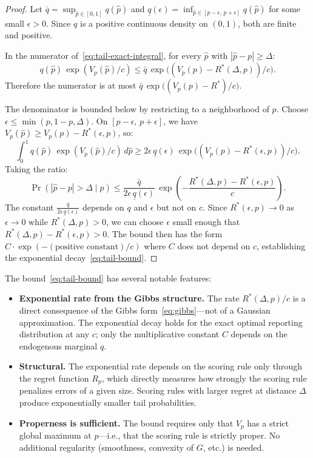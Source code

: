 \documentclass[11pt]{article}
\begin{document}
\begin{proof}
Let $\bar{q} = \sup_{\hat{p} \in [0,1]} q(\hat{p})$ and $\underline{q}(\epsilon) = \inf_{\hat{p} \in [p-\epsilon,\, p+\epsilon]} q(\hat{p})$ for some small $\epsilon > 0$. Since $q$ is a positive continuous density on $(0,1)$, both are finite and positive.

In the numerator of~\eqref{eq:tail-exact-integral}, for every $\hat{p}$ with $|\hat{p}-p| \geq \Delta$:
\[
q(\hat{p})\,\exp(V_p(\hat{p})/c) \leq \bar{q}\,\exp\!\big((V_p(p) - R^*(\Delta,p))/c\big).
\]
Therefore the numerator is at most $\bar{q}\,\exp\!\big((V_p(p) - R^*)/c\big)$.

The denominator is bounded below by restricting to a neighborhood of $p$. Choose $\epsilon \leq \min(p, 1-p, \Delta)$. On $[p-\epsilon,\,p+\epsilon]$, we have $V_p(\hat{p}) \geq V_p(p) - R^*(\epsilon, p)$, so:
\[
\int_0^1 q(\hat{p})\,\exp(V_p(\hat{p})/c)\,d\hat{p} \geq 2\epsilon\,\underline{q}(\epsilon)\,\exp\!\big((V_p(p) - R^*(\epsilon,p))/c\big).
\]
Taking the ratio:
\[
\Pr(|\hat{p}-p|>\Delta \mid p) \leq \frac{\bar{q}}{2\epsilon\,\underline{q}(\epsilon)}\,\exp\!\left(-\frac{R^*(\Delta,p) - R^*(\epsilon,p)}{c}\right).
\]
The constant $\frac{\bar{q}}{2\epsilon\,\underline{q}(\epsilon)}$ depends on $q$ and $\epsilon$ but not on $c$. Since $R^*(\epsilon, p) \to 0$ as $\epsilon \to 0$ while $R^*(\Delta,p) > 0$, we can choose $\epsilon$ small enough that $R^*(\Delta,p) - R^*(\epsilon,p) > 0$. The bound then has the form $C \cdot \exp(-(\text{positive constant})/c)$ where $C$ does not depend on $c$, establishing the exponential decay~\eqref{eq:tail-bound}.
\end{proof}

The bound~\eqref{eq:tail-bound} has several notable features:

\begin{itemize}
\item \textbf{Exponential rate from the Gibbs structure.} The rate $R^*(\Delta,p)/c$ is a direct consequence of the Gibbs form~\eqref{eq:gibbs}---not of a Gaussian approximation. The exponential decay holds for the exact optimal reporting distribution at any $c$; only the multiplicative constant $C$ depends on the endogenous marginal $q$.

\item \textbf{Structural.} The exponential rate depends on the scoring rule only through the regret function $R_p$, which directly measures how strongly the scoring rule penalizes errors of a given size. Scoring rules with larger regret at distance $\Delta$ produce exponentially smaller tail probabilities.

\item \textbf{Properness is sufficient.} The bound requires only that $V_p$ has a strict global maximum at $p$---i.e., that the scoring rule is strictly proper. No additional regularity (smoothness, convexity of $G$, etc.) is needed.
\end{itemize}
\end{document}
